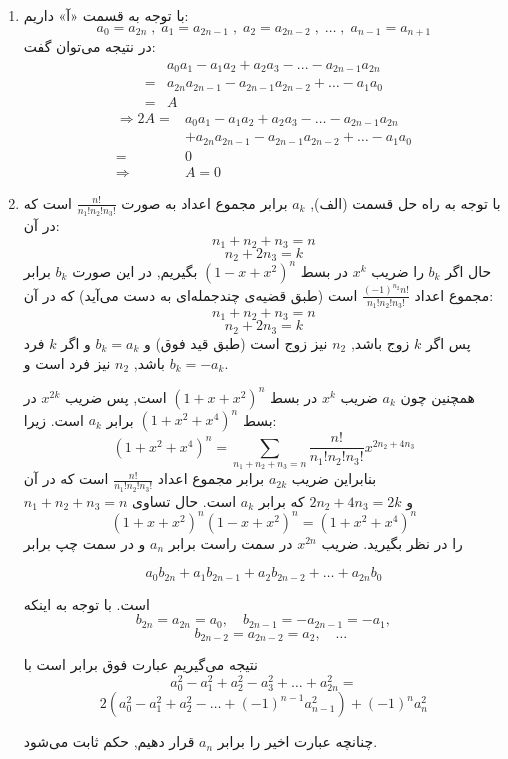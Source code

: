 \begin{enumerate}
	\item
        \p
          با توجه به قسمت  
          «آ»
          داریم:
    	$$a_0 = a_{2n} \; ,\; a_1 = a_{2n - 1}\; ,\; a_2 = a_{2n - 2}\; ,\; \dots \; ,\; a_{n - 1} = a_{n + 1}$$
        در نتیجه می‌توان گفت:
        \begin{align*}
            &a_0a_1 - a_1a_2 + a_2a_3 - ... - a_{2n-1}a_{2n} \\
            = &a_{2n}a_{2n-1} - a_{2n-1}a_{2n-2} +\dots - a_1a_0 \\ 
            = &A
        \end{align*}
    	\begin{align*}
    		\Rightarrow 2A = &a_0a_1 - a_1a_2 + a_2a_3 - \dots - a_{2n-1}a_{2n}\\
    		&+ a_{2n}a_{2n-1} - a_{2n-1}a_{2n-2} +\dots - a_1a_0 \\
            = &0\\
    		\Rightarrow &A = 0
    	\end{align*}
	
	\item
        \p
    	با توجه به راه حل قسمت (الف), $a_k$ برابر مجموع اعداد به صورت $\frac{n!}{n_1!n_2!n_3!}$ است که در آن:
    	$$n_1 + n_2 + n_3 = n$$ 
    	$$n_2 + 2n_3 = k$$
    	 حال اگر $b_k$ را ضریب $x^k$ در بسط $(1 - x + x^2)^n$ بگیریم, در این صورت $b_k$ برابر مجموع اعداد $\frac{(-1)^{n_2}n!}{n_1!n_2!n_3!}$ است (طبق قضیه‌ی چندجمله‌ای  به دست می‌آید) که در آن:
    	 $$n_1 + n_2 + n_3 =  n$$ 
    	 $$n_2 + 2n_3 = k$$
    	 پس اگر $k$ زوج باشد, $n_2$ نیز زوج است (طبق قید فوق) و $b_k = a_k$ و اگر $k$ فرد باشد, $n_2$ نیز فرد است و $b_k = -a_k$.
    	 
        \p
        همچنین چون $a_k$ ضریب $x^k$ در بسط $(1 + x + x^2)^n$ است, پس ضریب $x^{2k}$ در بسط $(1 + x^2 + x^4)^n$ برابر $a_k$ است. زیرا:
         $$(1+x^2+x^4)^n=\sum_{n_1+n_2+n_3=n} \frac{n!}{n_1!n_2!n_3!} x^{2n_2+4n_3}$$
         بنابراین ضریب $a_{2k}$ برابر مجموع اعداد $\frac{n!}{n_1!n_2!n_3!}$
          است که در آن\\
           $n_1+n_2+n_3=n$ و $2n_2+4n_3=2k$
           که برابر $a_k$ است. حال تساوی
        $$(1 + x + x^2)^n(1 - x + x^2)^n = (1 + x^2 + x^4)^n$$
        را در نظر بگیرید. ضریب $x^{2n}$ در سمت راست برابر $a_n$ و در سمت چپ برابر
        
        $$a_0b_{2n} + a_1b_{2n - 1} + a_2b_{2n - 2} + \dots + a_{2n}b_0$$
        
        است. با توجه به اینکه
        $$b_{2n} = a_{2n} = a_0,\quad b_{2n - 1} = -a_{2n - 1} = -a_1,$$
        $$\quad b_{2n - 2} = a_{2n - 2} = a_2,\quad \dots$$
    	
        نتیجه می‌گیریم عبارت فوق برابر است با
        $$a_0^2 - a_1^2 + a_2^2 - a_3^2 + \dots + a_{2n}^2 = $$
        $$2(a_0^2 - a_1^2 + a_2^2 - \dots + (-1)^{n - 1}a_{n - 1}^2) + (-1)^n a_n^2$$
    	
        چنانچه عبارت اخیر را برابر $a_n$ قرار دهیم, حکم ثابت می‌شود.
        
        
	\end{enumerate}
